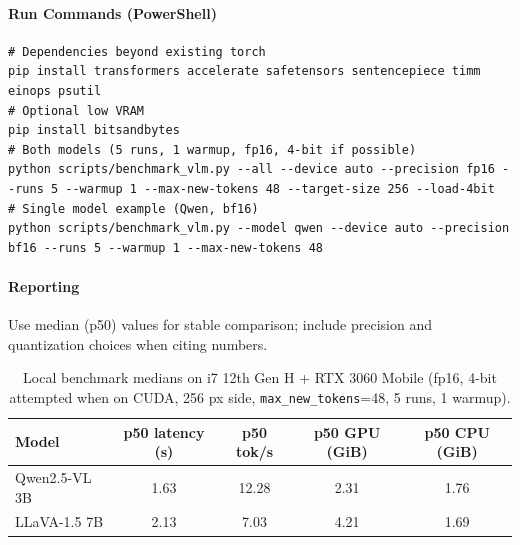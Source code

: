 \documentclass[11pt,a4paper]{article}
\newcommand{\code}[1]{\texttt{#1}}
\begin{document}
\paragraph{Run Commands (PowerShell)}
\begin{lstlisting}[style=code]
# Dependencies beyond existing torch
pip install transformers accelerate safetensors sentencepiece timm einops psutil
# Optional low VRAM
pip install bitsandbytes
# Both models (5 runs, 1 warmup, fp16, 4-bit if possible)
python scripts/benchmark_vlm.py --all --device auto --precision fp16 --runs 5 --warmup 1 --max-new-tokens 48 --target-size 256 --load-4bit
# Single model example (Qwen, bf16)
python scripts/benchmark_vlm.py --model qwen --device auto --precision bf16 --runs 5 --warmup 1 --max-new-tokens 48
\end{lstlisting}

\paragraph{Reporting}
Use median (p50) values for stable comparison; include precision and quantization choices when citing numbers.

\begin{table}[h]
\centering
\small
\begin{tabular}{l c c c c}
    \toprule
Model & p50 latency (s) & p50 tok/s & p50 GPU (GiB) & p50 CPU (GiB) \\
\midrule
Qwen2.5-VL 3B & 1.63 & 12.28 & 2.31 & 1.76 \\
LLaVA-1.5 7B & 2.13 & 7.03 & 4.21 & 1.69 \\
\bottomrule
\end{tabular}
\caption{Local benchmark medians on i7 12th Gen H + RTX 3060 Mobile (fp16, 4-bit attempted when on CUDA, 256 px side, \code{max\_new\_tokens}=48, 5 runs, 1 warmup).}
\label{tab:vlm-local-bench}
\end{table}
\end{document}
